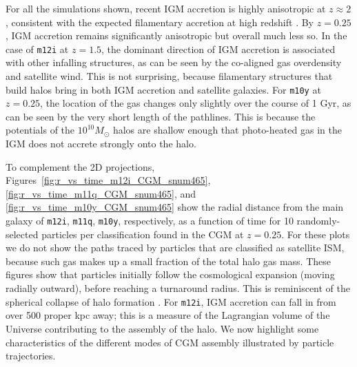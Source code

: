 \documentclass[fleqn,usenatbib]{mnras}
\begin{document}
For all the simulations shown, recent IGM accretion is highly anisotropic at $z \approx 2$, consistent with the expected filamentary accretion at high redshift \citep[e.g.,][]{Keres2005, Dekel2006, 2011MNRAS.412L.118F}. 
By $z=0.25$, IGM accretion remains significantly anisotropic but overall much less so.
In the case of \texttt{m12i} at $z=1.5$, the dominant direction of IGM accretion is associated with other infalling structures, as can be seen by the co-aligned gas overdensity and satellite wind.
This is not surprising, because filamentary structures that build halos bring in both IGM accretion and satellite galaxies.
For \texttt{m10y} at $z=0.25$, the location of the gas changes only slightly over the course of 1 Gyr, as can be seen by the very short length of the pathlines.
This is because the potentials of the $10^{10}M_\odot$ halos are shallow enough that photo-heated gas in the IGM does not accrete strongly onto the halo.

To complement the 2D projections, Figures~\ref{fig:r_vs_time_m12i_CGM_snum465}, \ref{fig:r_vs_time_m11q_CGM_snum465}, and \ref{fig:r_vs_time_m10y_CGM_snum465} show the radial distance from the main galaxy of \texttt{m12i}, \texttt{m11q}, \texttt{m10y}, respectively, as a function of time for 10 randomly-selected particles per classification found in the CGM at $z=0.25$.
For these plots we do not show the paths traced by particles that are classified as satellite ISM, because such gas makes up a small fraction of the total halo gas mass.
These figures show that particles initially follow the cosmological expansion (moving radially outward), before reaching a turnaround radius.
This is reminiscent of the spherical collapse of halo formation \citep[][]{1972ApJ...176....1G}. 
For \texttt{m12i}, IGM accretion can fall in from over 500 proper kpc away; this is a measure of the Lagrangian volume of the Universe contributing to the assembly of the halo.
We now highlight some characteristics of the different modes of CGM assembly illustrated by particle trajectories.
\end{document}
